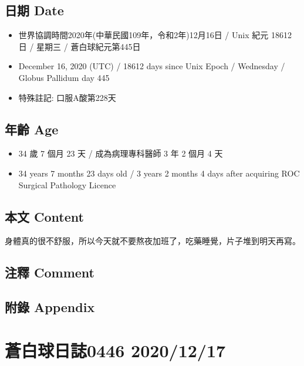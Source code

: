 \documentclass[a5paper, 11pt
]{book}
\providecommand{\tightlist}{%
  \setlength{\itemsep}{0pt}\setlength{\parskip}{0pt}}
\begin{document}
\hypertarget{ux65e5ux671f-date-15}{%
\subsection{日期 Date}\label{ux65e5ux671f-date-15}}

\begin{itemize}
\tightlist
\item
  世界協調時間2020年(中華民國109年，令和2年)12月16日 / Unix 紀元 18612
  日 / 星期三 / 蒼白球紀元第445日
\item
  December 16, 2020 (UTC) / 18612 days since Unix Epoch / Wednesday /
  Globus Pallidum day 445
\item
  特殊註記: 口服A酸第228天
\end{itemize}

\hypertarget{ux5e74ux9f61-age-15}{%
\subsection{年齡 Age}\label{ux5e74ux9f61-age-15}}

\begin{itemize}
\tightlist
\item
  34 歲 7 個月 23 天 / 成為病理專科醫師 3 年 2 個月 4 天
\item
  34 years 7 months 23 days old / 3 years 2 months 4 days after
  acquiring ROC Surgical Pathology Licence
\end{itemize}

\hypertarget{ux672cux6587-content-15}{%
\subsection{本文 Content}\label{ux672cux6587-content-15}}

身體真的很不舒服，所以今天就不要熬夜加班了，吃藥睡覺，片子堆到明天再寫。

\hypertarget{ux6ce8ux91cb-comment-15}{%
\subsection{注釋 Comment}\label{ux6ce8ux91cb-comment-15}}

\hypertarget{ux9644ux9304-appendix-15}{%
\subsection{附錄 Appendix}\label{ux9644ux9304-appendix-15}}

\hypertarget{ux84bcux767dux7403ux65e5ux8a8c0446-20201217}{%
\section{蒼白球日誌0446
2020/12/17}\label{ux84bcux767dux7403ux65e5ux8a8c0446-20201217}}
\end{document}
